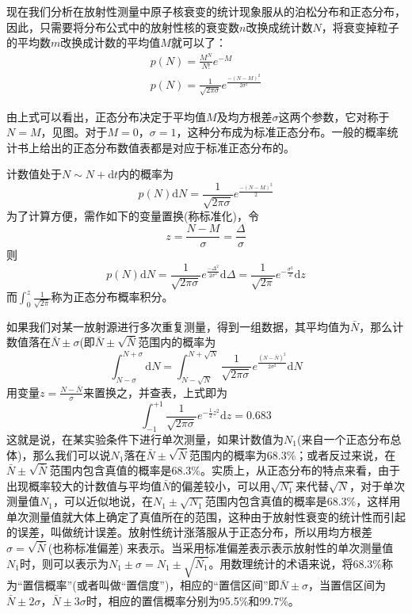 \documentclass[a4paper]{article}
\begin{document}
现在我们分析在放射性测量中原子核衰变的统计现象服从的泊松分布和正态分布，因此，只需要将分布公式中的放射性核的衰变数$n$改换成统计数$N$，将衰变掉粒子的平均数$m$改换成计数的平均值$M$就可以了：
\begin{eqnarray}
	p(N) = \frac{M^N}{N!}e^{-M}\label{eq9}\\
	p(N) = \frac{1}{\sqrt{2\pi\sigma}}e^{\frac{-(N-M)^2}{2\sigma^2}}\label{eq10}
\end{eqnarray}

由上式可以看出，正态分布决定于平均值$M$及均方根差$\sigma$这两个参数，它对称于$N=M$，见图。对于$M=0$，$\sigma=1$，这种分布成为标准正态分布。一般的概率统计书上给出的正态分布数值表都是对应于标准正态分布的。

计数值处于$N\sim N+\text{d}t$内的概率为
\begin{equation}
	p(N)\text{d}N = \frac{1}{\sqrt{2\pi\sigma}}e^{\frac{-(N-M)^2}{2}}\label{eq11}
\end{equation}
为了计算方便，需作如下的变量置换(称标准化)，令
\begin{equation*}
	z = \frac{N-M}{\sigma} = \frac{\Delta}{\sigma}
\end{equation*}
则
\begin{equation}
	p(N)\text{d}N = \frac{1}{\sqrt{2\pi\sigma}}e^{\frac{-\Delta^2}{2\sigma^2}}\text{d}\Delta = \frac{1}{\sqrt{2\pi}}e^{-\frac{\sigma^2}{2}}\text{d}z
\end{equation}
而$\int_0^z\frac{1}{\sqrt{2\pi}}$称为正态分布概率积分。

如果我们对某一放射源进行多次重复测量，得到一组数据，其平均值为$\bar{N}$，那么计数值落在$\bar{N}\pm\sigma$(即$\bar{N}\pm\sqrt{\bar{N}}$范围内的概率为
\begin{equation*}
	\int_{N-\sigma}^{N+\sigma}\text{d}N = \int_{N-\sqrt{N}}^{N+\sqrt{N}}\frac{1}{\sqrt{2\pi\sigma}}e^{\frac{(N-\bar{N})^2}{2\sigma^2}}\text{d}N
\end{equation*}
用变量$z = \frac{N-\bar{N}}{\sigma}$来置换之，并查表，上式即为
\begin{equation*}
	\int_{-1}^{+1}\frac{1}{\sqrt{2\pi\sigma}}e^{-\frac12z^2}\text{d}z = 0.683
\end{equation*}
这就是说，在某实验条件下进行单次测量，如果计数值为$N_1$(来自一个正态分布总体)，那么我们可以说$N_1$落在$\bar{N}\pm\sqrt{\bar{N}}$范围内的概率为68.3\%；或者反过来说，在$\bar{N}\pm\sqrt{\bar{N}}$范围内包含真值的概率是68.3\%。实质上，从正态分布的特点来看，由于出现概率较大的计数值与平均值$\bar{N}$的偏差较小，可以用$\sqrt{N_1}$来代替$\sqrt{N}$，对于单次测量值$N_1$，可以近似地说，在$N_1\pm\sqrt{N_1}$范围内包含真值的概率是68.3\%，这样用单次测量值就大体上确定了真值所在的范围，这种由于放射性衰变的统计性而引起的误差，叫做统计误差。放射性统计涨落服从于正态分布，所以用均方根差$\sigma = \sqrt{\bar{N}}$(也称标准偏差) 来表示。当采用标准偏差表示表示放射性的单次测量值$N_1$时，则可以表示为$N_1\pm\sigma = N_1\pm\sqrt{\bar{N_1}}$。用数理统计的术语来说，将68.3\%称为“置信概率”(或者叫做“置信度”)，相应的“置信区间”即$\bar{N}\pm\sigma$，当置信区间为$\bar{N}\pm2\sigma$，$\bar{N}\pm3\sigma$时，相应的置信概率分别为95.5\%和99.7\%。
\end{document}
